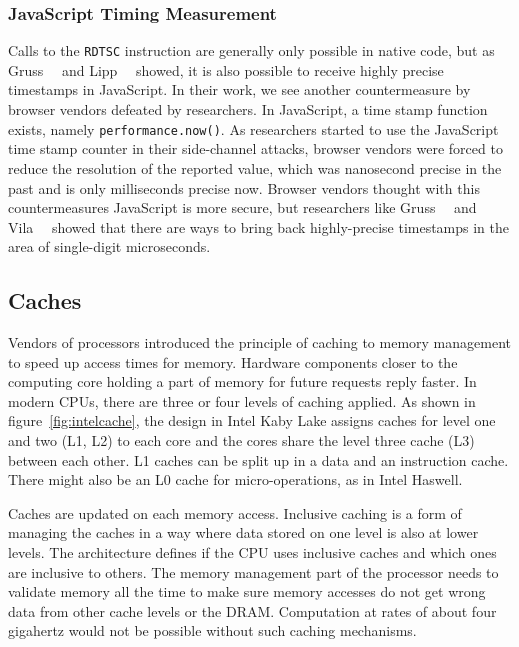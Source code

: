 \subsubsection{JavaScript Timing Measurement}

Calls to the \texttt{RDTSC} instruction are generally only possible in native
code, but as Gruss~\etal~\cite{memdedupjs} and Lipp~\etal~\cite{keytimejs}
showed, it is also possible to receive highly precise timestamps in JavaScript.
In their work, we see another countermeasure by browser vendors defeated by
researchers. In JavaScript, a time stamp function exists, namely
\texttt{performance.now()}. As researchers started to use the JavaScript time
stamp counter in their side-channel attacks, browser vendors were forced to
reduce the resolution of the reported value, which was nanosecond precise in the
past and is only milliseconds precise now. Browser vendors thought with this
countermeasures JavaScript is more secure, but researchers like
Gruss~\etal~\cite{memdedupjs} and Vila~\etal~\cite{loophole} showed that there
are ways to bring back highly-precise timestamps in the area of single-digit
microseconds.

\subsection{Caches}

Vendors of processors introduced the principle of caching to memory management
to speed up access times for memory. Hardware components closer to the computing
core holding a part of memory for future requests reply faster. In modern CPUs,
there are three or four levels of caching applied. As shown in
figure~\ref{fig:intelcache}, the design in Intel Kaby Lake assigns caches for
level one and two (L1, L2) to each core and the cores share the level three
cache (L3) between each other. L1 caches can be split up in a data and an
instruction cache. There might also be an L0 cache for micro-operations, as in
Intel Haswell.

Caches are updated on each memory access. Inclusive caching is a form of
managing the caches in a way where data stored on one level is also at lower
levels. The architecture defines if the CPU uses inclusive caches and which ones
are inclusive to others. The memory management part of the processor needs to
validate memory all the time to make sure memory accesses do not get wrong data
from other cache levels or the DRAM. Computation at rates of about four
gigahertz would not be possible without such caching mechanisms.

